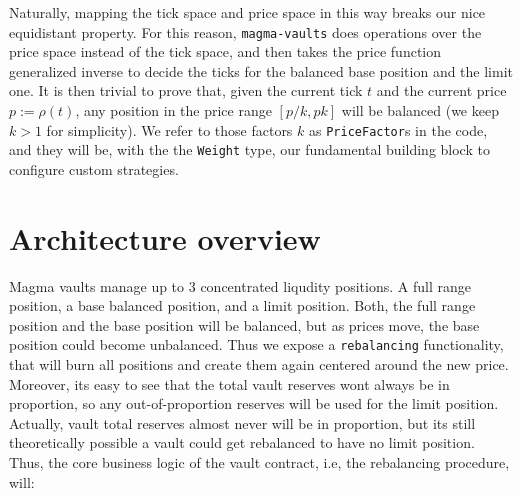 \documentclass[11pt]{article}
\begin{document}
Naturally, mapping the tick space and price space in this way breaks our nice
equidistant property. For this reason, \texttt{magma-vaults} does operations over
the price space instead of the tick space, and then takes the price function
generalized inverse to decide the ticks for the balanced base position and the
limit one. It is then trivial to prove that, given the current tick $t$ and the
current price $p := \rho(t)$, any position in the price range $[p/k, pk]$ will
be balanced (we keep $k > 1$ for simplicity). We refer to those factors $k$ as
\texttt{PriceFactor}s in the code, and they will be, with the the
\texttt{Weight} type, our fundamental building block to configure custom
strategies.

\section{Architecture overview}
Magma vaults manage up to 3 concentrated liqudity positions. A full range
position, a base balanced position, and a limit position. Both, the full range
position and the base position will be balanced, but as prices move, the base
position could become unbalanced. Thus we expose a \texttt{rebalancing}
functionality, that will burn all positions and create them again centered
around the new price. Moreover, its easy to see that the total vault reserves
wont always be in proportion, so any out-of-proportion reserves will be used
for the limit position. Actually, vault total reserves almost never will be in
proportion, but its still theoretically possible a vault could get rebalanced
to have no limit position. Thus, the core business logic of the vault contract,
i.e, the rebalancing procedure, will:
\end{document}
